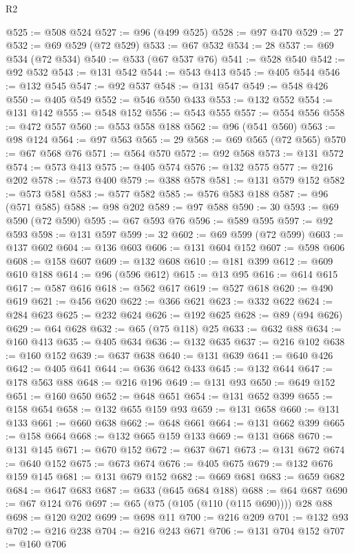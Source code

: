 \begin{lexlean}{R2}
\begin{coremodule}
@525 := @508 @524
@527 := @96 (@499 @525)
@528 := @97 @470
@529 := 27
@532 := @69 @529 (@72 @529)
@533 := @67 @532
@534 := 28
@537 := @69 @534 (@72 @534)
@540 := @533 (@67 @537 @76)
@541 := @528 @540
@542 := @92 @532
@543 := @131 @542
@544 := @543 @413
@545 := @405 @544
@546 := @132 @545
@547 := @92 @537
@548 := @131 @547
@549 := @548 @426
@550 := @405 @549
@552 := @546 @550 @433
@553 := @132 @552
@554 := @131 @142
@555 := @548 @152
@556 := @543 @555
@557 := @554 @556
@558 := @472 @557
@560 := @553 @558 @188
@562 := @96 (@541 @560)
@563 := @98 @124
@564 := @97 @563
@565 := 29
@568 := @69 @565 (@72 @565)
@570 := @67 @568 @76
@571 := @564 @570
@572 := @92 @568
@573 := @131 @572
@574 := @573 @413
@575 := @405 @574
@576 := @132 @575
@577 := @216 @202
@578 := @573 @400
@579 := @388 @578
@581 := @131 @579 @152
@582 := @573 @581
@583 := @577 @582
@585 := @576 @583 @188
@587 := @96 (@571 @585)
@588 := @98 @202
@589 := @97 @588
@590 := 30
@593 := @69 @590 (@72 @590)
@595 := @67 @593 @76
@596 := @589 @595
@597 := @92 @593
@598 := @131 @597
@599 := 32
@602 := @69 @599 (@72 @599)
@603 := @137 @602
@604 := @136 @603
@606 := @131 @604 @152
@607 := @598 @606
@608 := @158 @607
@609 := @132 @608
@610 := @181 @399
@612 := @609 @610 @188
@614 := @96 (@596 @612)
@615 := @13 @95
@616 := @614 @615
@617 := @587 @616
@618 := @562 @617
@619 := @527 @618
@620 := @490 @619
@621 := @456 @620
@622 := @366 @621
@623 := @332 @622
@624 := @284 @623
@625 := @232 @624
@626 := @192 @625
@628 := @89 (@94 @626)
@629 := @64 @628
@632 := @65 (@75 @118) @25
@633 := @632 @88
@634 := @160 @413
@635 := @405 @634
@636 := @132 @635
@637 := @216 @102
@638 := @160 @152
@639 := @637 @638
@640 := @131 @639
@641 := @640 @426
@642 := @405 @641
@644 := @636 @642 @433
@645 := @132 @644
@647 := @178 @563 @88
@648 := @216 @196
@649 := @131 @93
@650 := @649 @152
@651 := @160 @650
@652 := @648 @651
@654 := @131 @652 @399
@655 := @158 @654
@658 := @132 @655 @159 @93
@659 := @131 @658
@660 := @131 @133
@661 := @660 @638
@662 := @648 @661
@664 := @131 @662 @399
@665 := @158 @664
@668 := @132 @665 @159 @133
@669 := @131 @668
@670 := @131 @145
@671 := @670 @152
@672 := @637 @671
@673 := @131 @672
@674 := @640 @152
@675 := @673 @674
@676 := @405 @675
@679 := @132 @676 @159 @145
@681 := @131 @679 @152
@682 := @669 @681
@683 := @659 @682
@684 := @647 @683
@687 := @633 (@645 @684 @188)
@688 := @64 @687
@690 := @67 @124 @76
@697 := @65 (@75 (@105 (@110 (@115 @690)))) @28 @88
@698 := @120 @202
@699 := @698 @11
@700 := @216 @209
@701 := @132 @93
@702 := @216 @238
@704 := @216 @243 @671
@706 := @131 @704 @152
@707 := @160 @706

\end{coremodule}
\end{lexlean}
